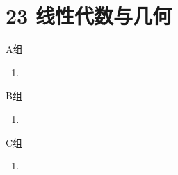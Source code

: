 \section*{23 线性代数与几何}

\vspace{2ex}

\centerline{\heiti A组}
\begin{enumerate}
    \item
\end{enumerate}

\centerline{\heiti B组}
\begin{enumerate}
    \item
\end{enumerate}

\centerline{\heiti C组}
\begin{enumerate}
    \item
\end{enumerate}

\clearpage
